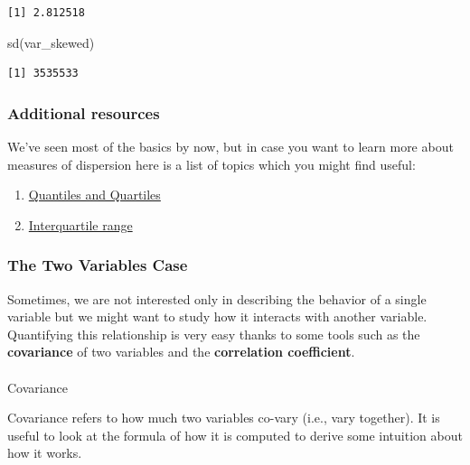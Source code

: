 \documentclass[
  letterpaper,
  DIV=11,
  numbers=noendperiod]{scrartcl}
\makeatletter
\let\oldparagraph\paragraph
\renewcommand{\paragraph}{
    \@ifstar
      \xxxParagraphStar
      \xxxParagraphNoStar
  }
\newcommand{\xxxParagraphStar}[1]{\oldparagraph*{#1}\mbox{}}
\newcommand{\xxxParagraphNoStar}[1]{\oldparagraph{#1}\mbox{}}
\newenvironment{Shaded}{\begin{snugshade}}{\end{snugshade}}
\newcommand{\FunctionTok}[1]{\textcolor[rgb]{0.28,0.35,0.67}{#1}}
\newcommand{\NormalTok}[1]{\textcolor[rgb]{0.00,0.23,0.31}{#1}}
\providecommand{\tightlist}{%
  \setlength{\itemsep}{0pt}\setlength{\parskip}{0pt}}\usepackage{longtable,booktabs,array}
\makeatother
\begin{document}
\begin{verbatim}
[1] 2.812518
\end{verbatim}

\begin{Shaded}
\begin{Highlighting}[]
\FunctionTok{sd}\NormalTok{(var\_skewed)}
\end{Highlighting}
\end{Shaded}

\begin{verbatim}
[1] 3535533
\end{verbatim}

\subsubsection{Additional resources}\label{additional-resources}

We've seen most of the basics by now, but in case you want to learn more
about measures of dispersion here is a list of topics which you might
find useful:

\begin{enumerate}
\def\labelenumi{\arabic{enumi}.}
\tightlist
\item
  \href{https://www.scribbr.com/statistics/quartiles-quantiles/\#:~:text=A\%20quartile\%20is\%20a\%20type,sorted\%20data\%20into\%20q\%20parts.}{Quantiles
  and Quartiles}
\item
  \href{https://en.wikipedia.org/wiki/Interquartile_range}{Interquartile
  range}
\end{enumerate}

\subsubsection{The Two Variables Case}\label{the-two-variables-case}

Sometimes, we are not interested only in describing the behavior of a
single variable but we might want to study how it interacts with another
variable. Quantifying this relationship is very easy thanks to some
tools such as the \textbf{covariance} of two variables and the
\textbf{correlation coefficient}.

\paragraph{Covariance}\label{covariance}

Covariance refers to how much two variables co-vary (i.e., vary
together). It is useful to look at the formula of how it is computed to
derive some intuition about how it works.
\end{document}
